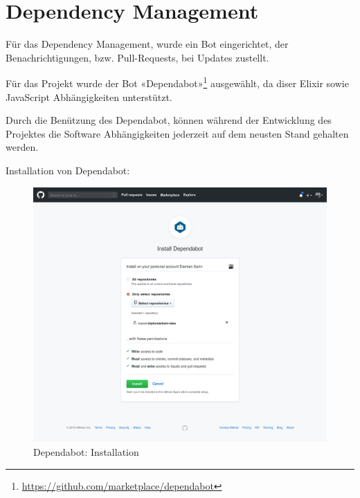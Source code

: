 \clearpage
\section{Dependency Management}

Für das Dependency Management, wurde ein Bot eingerichtet, der
Benachrichtigungen, bzw. Pull-Requests, bei Updates zustellt.

Für das Projekt wurde der Bot «Dependabot»\footnote{\url{https://github.com/marketplace/dependabot}} ausgewählt, da diser Elixir sowie JavaScript Abhängigkeiten unterstützt.

Durch die Benützung des Dependabot, können während der Entwicklung des Projektes
die Software Abhängigkeiten jederzeit auf dem neusten Stand gehalten werden.

\noindent{}Installation von Dependabot:

\begin{figure}[!htb]
  \centering
  \includegraphics[width=1\textwidth]{realisierung/install-dependabot-1.png}
  \caption{Dependabot: Installation}
\end{figure}

